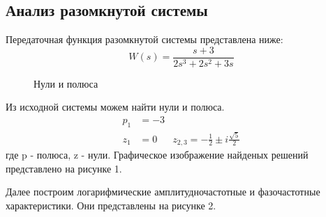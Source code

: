 \documentclass[a4paper, 12pt]{article}
\begin{document}
\newpage
\begin{center}
\section{Анализ разомкнутой системы}
\end{center}

Передаточная функция разомкнутой системы представлена ниже:
\begin{equation}
    W(s) = \frac{s + 3}{2s^3 + 2s^2 + 3s}
\end{equation}

\noindent
\begin{minipage}[t]{0.5\textwidth}
    \begin{figure} [H]
        \centering
        \caption{Нули и полюса}
    \end{figure}
\end{minipage}
\begin{minipage}[t]{0.5\textwidth}
    \vspace{0.5cm}
    Из исходной системы можем найти нули и полюса.
    \begin{align*}
        p_1 & = -3 \\
        z_1 & = 0 & z_{2, 3} = -\frac{1}{2} \pm i\frac{\sqrt{5}}{2}
    \end{align*}
    где p - полюса, z - нули. Графическое изображение найденых решений представлено на рисунке 1.
\end{minipage}
\vspace{0.5cm} \par

Далее построим логарифмические амплитудночастотные и фазочастотные характеристики. Они представлены на рисунке 2.
\end{document}
